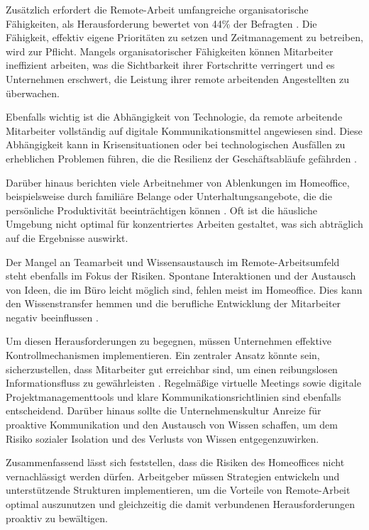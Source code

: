 Zusätzlich erfordert die Remote-Arbeit umfangreiche organisatorische Fähigkeiten, als Herausforderung bewertet von 44\% der Befragten \cite{file4}. Die Fähigkeit, effektiv eigene Prioritäten zu setzen und Zeitmanagement zu betreiben, wird zur Pflicht. Mangels organisatorischer Fähigkeiten können Mitarbeiter ineffizient arbeiten, was die Sichtbarkeit ihrer Fortschritte verringert und es Unternehmen erschwert, die Leistung ihrer remote arbeitenden Angestellten zu überwachen.

Ebenfalls wichtig ist die Abhängigkeit von Technologie, da remote arbeitende Mitarbeiter vollständig auf digitale Kommunikationsmittel angewiesen sind. Diese Abhängigkeit kann in Krisensituationen oder bei technologischen Ausfällen zu erheblichen Problemen führen, die die Resilienz der Geschäftsabläufe gefährden \cite{8}.

Darüber hinaus berichten viele Arbeitnehmer von Ablenkungen im Homeoffice, beispielsweise durch familiäre Belange oder Unterhaltungsangebote, die die persönliche Produktivität beeinträchtigen können \cite{8}. Oft ist die häusliche Umgebung nicht optimal für konzentriertes Arbeiten gestaltet, was sich abträglich auf die Ergebnisse auswirkt.

Der Mangel an Teamarbeit und Wissensaustausch im Remote-Arbeitsumfeld steht ebenfalls im Fokus der Risiken. Spontane Interaktionen und der Austausch von Ideen, die im Büro leicht möglich sind, fehlen meist im Homeoffice. Dies kann den Wissenstransfer hemmen und die berufliche Entwicklung der Mitarbeiter negativ beeinflussen \cite{8}.

Um diesen Herausforderungen zu begegnen, müssen Unternehmen effektive Kontrollmechanismen implementieren. Ein zentraler Ansatz könnte sein, sicherzustellen, dass Mitarbeiter gut erreichbar sind, um einen reibungslosen Informationsfluss zu gewährleisten \cite{8}. Regelmäßige virtuelle Meetings sowie digitale Projektmanagementtools und klare Kommunikationsrichtlinien sind ebenfalls entscheidend. Darüber hinaus sollte die Unternehmenskultur Anreize für proaktive Kommunikation und den Austausch von Wissen schaffen, um dem Risiko sozialer Isolation und des Verlusts von Wissen entgegenzuwirken.

Zusammenfassend lässt sich feststellen, dass die Risiken des Homeoffices nicht vernachlässigt werden dürfen. Arbeitgeber müssen Strategien entwickeln und unterstützende Strukturen implementieren, um die Vorteile von Remote-Arbeit optimal auszunutzen und gleichzeitig die damit verbundenen Herausforderungen proaktiv zu bewältigen.